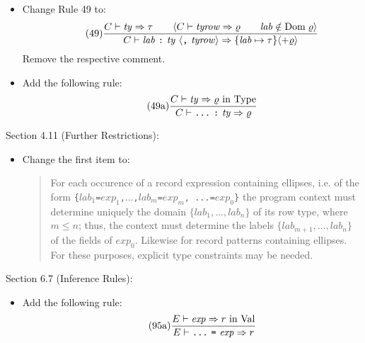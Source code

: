 \documentclass[twoside,titlepage]{article}
\begin{document}
\begin{appendix}
\begin{itemize}
\item Change Rule 49 to: 
  \begin{equation}
  \tag{49}
  \frac{
  C \vdash \mathit{ty} \Rightarrow \tau
  \qquad
  \langle C \vdash \mathit{tyrow} \Rightarrow \varrho
  \qquad
  \mathit{lab} \notin \mbox{Dom}\; \varrho \rangle
  }{
  C \vdash \mathit{lab}~\mbox{\tt:}~\mathit{ty}~\langle\mbox{\tt,}~\mathit{tyrow}\rangle
    \Rightarrow \{\mathit{lab} \mapsto \tau \} \langle+ \varrho\rangle
  }
  \end{equation}
  Remove the respective comment. 

\item Add the following rule: 
  \begin{equation}
  \tag{49a}
  \frac{
  C \vdash \mathit{ty} \Rightarrow \mbox{$\varrho$ in Type}
  }{
  C \vdash \mbox{\tt...}~\mbox{\tt:}~\mathit{ty} \Rightarrow \varrho
  }
  \end{equation}
\end{itemize}

Section 4.11 (Further Restrictions):
\begin{itemize}
\item Change the first item to: 
  \begin{quote}
  For each occurence of a record expression containing ellipses, i.e. of the form {\tt\{$\mathit{lab}_1$=$\mathit{exp}_1$,$\dots$,$\mathit{lab}_m$=$\mathit{exp}_m$, ...=$\mathit{exp}_0$\}} the program context must determine uniquely the domain $\{\mathit{lab}_1,\dots,\mathit{lab}_n\}$ of its row type, where $m \leq n$; thus, the context must determine the labels $\{\mathit{lab}_{m+1},\dots,\mathit{lab}_n\}$ of the fields of $\mathit{exp}_0$.  Likewise for record patterns containing ellipses. For these purposes, explicit type constraints may be needed.
  \end{quote}
\end{itemize}

Section 6.7 (Inference Rules):
\begin{itemize}
\item Add the following rule:
  \begin{equation}
  \tag{95a}
  \frac{
  E \vdash \mathit{exp} \Rightarrow \mbox{$r$ in Val}
  }{
  E \vdash \mbox{\tt...}~\mbox{\tt=}~\mathit{exp} \Rightarrow r
  }
  \end{equation}


\end{itemize}
\end{appendix}
\end{document}
